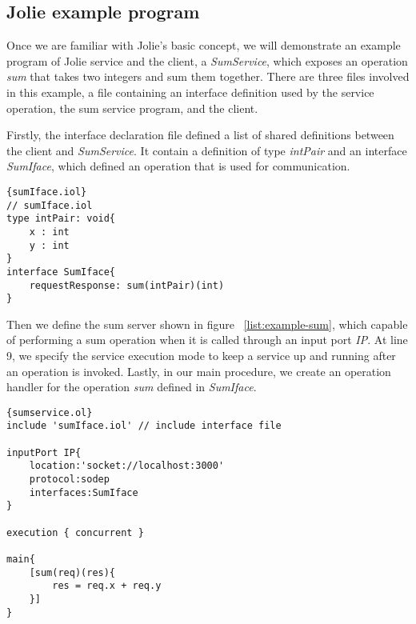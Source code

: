 \subsection{Jolie example program}

Once we are familiar with Jolie's basic concept, we will demonstrate an example program of Jolie service and the client, a \textit{SumService}, which exposes an operation \textit{sum} that takes two integers and sum them together. There are three files involved in this example, a file containing an interface definition used by the service operation, the sum service program, and the client.

Firstly, the interface declaration file defined a list of shared definitions between the client and \textit{SumService}. It contain a definition of type \textit{intPair} and an interface \textit{SumIface}, which defined an operation that is used for communication.

\begin{listing}[ht]
    \lstset{language=Jolie,
        style=codeStyle
    }
    \begin{lstlisting}[frame=tlrb,caption={Sum service interface}, basicstyle=\footnotesize, label={list:example-iol}]{sumIface.iol}
// sumIface.iol
type intPair: void{
    x : int
    y : int
}
interface SumIface{
    requestResponse: sum(intPair)(int)
}
\end{lstlisting}
\end{listing}

Then we define the sum server shown in figure ~\ref{list:example-sum}, which capable of performing a sum operation when it is called through an input port \textit{IP}. At line 9, we specify the service execution mode to keep a service up and running after an operation is invoked. Lastly, in our main procedure, we create an operation handler for the operation \textit{sum} defined in \textit{SumIface}.

\begin{listing}[ht]
    \lstset{language=Jolie,
        style=codeStyle,
        numbers=left,
        firstnumber=1
    }
    \begin{lstlisting}[frame=tlrb,basicstyle=\footnotesize, caption= {Sum service}, label={list:example-sum} ]{sumservice.ol}
include 'sumIface.iol' // include interface file

inputPort IP{
    location:'socket://localhost:3000'
    protocol:sodep 
    interfaces:SumIface
}

execution { concurrent }

main{
    [sum(req)(res){
        res = req.x + req.y
    }]
}
\end{lstlisting}
\end{listing}

